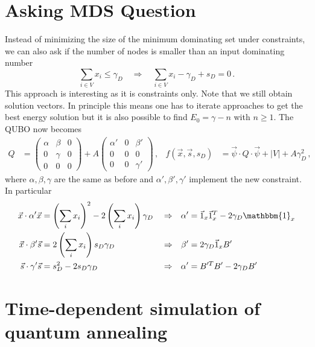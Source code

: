 \documentclass[]{article}
\begin{document}
\section{Asking MDS Question}
Instead of minimizing the size of the minimum dominating set under constraints, we can also ask if the number of nodes is smaller than an input dominating number
\begin{equation}
	\sum_{i \in V} x_i \leq \gamma_D \quad \Rightarrow \quad \sum_{i \in V} x_i - \gamma_D + s_D = 0 \, .
\end{equation}
This approach is interesting as it is constraints only.
Note that we still obtain solution vectors.
In principle this means one has to iterate approaches to get the best energy solution but it is also possible to find $E_0 = \gamma - n$ with $n\geq1$.
The QUBO now becomes
\begin{align}\label{mds2:qubo}
	Q &= 
	\begin{pmatrix}\alpha & \beta & 0 \\ 0 & \gamma & 0 \\ 0 & 0 & 0 \end{pmatrix}
	+
	A \begin{pmatrix}\alpha' & 0 & \beta' \\ 0 & 0 & 0 \\ 0 & 0 & \gamma' \end{pmatrix}
	\, , & 
	f(\vec x, \vec s, s_D)
	&=
	\vec \psi \cdot Q \cdot \vec \psi + |V| + A \gamma_D^2
	\, ,
\end{align}
where $\alpha, \beta, \gamma$ are the same as before and $\alpha', \beta', \gamma'$ implement the new constraint.
In particular 
\begin{align}
	\vec x \cdot \alpha' \vec x &= \left(\sum_i x_i\right)^2 - 2 \left(\sum_i x_i\right) \gamma_D 
	&& \Rightarrow &
	\alpha' &= \vec 1_x \vec 1_x^T - 2 \gamma_D \mathbbm{1}_x
	\\
	\vec x \cdot \beta' \vec s &= 2 \left(\sum_i x_i\right) s_D \gamma_D 
	&& \Rightarrow &
	\beta' &= 2 \gamma_D \vec 1_x B'
	\\
	\vec s \cdot \gamma' \vec s &= s_D^2 - 2 s_D \gamma_D 
	&& \Rightarrow &
	\alpha' &= B'^T B' - 2 \gamma_D B'
	\\
\end{align}


\section{Time-dependent simulation of quantum annealing}
\end{document}
